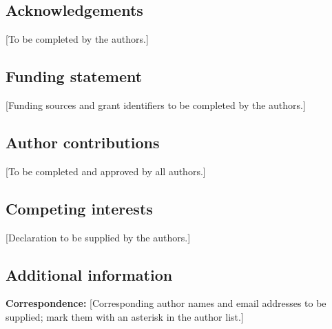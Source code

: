 \documentclass[
  12pt,
  a4paper,
]{article}
\begin{document}
\clearpage

\singlespacing\fontsize{11}{13}\selectfont

\hypertarget{acknowledgements}{%
\subsection{Acknowledgements}\label{acknowledgements}}

{[}To be completed by the authors.{]}

\singlespacing\fontsize{11}{13}\selectfont

\hypertarget{funding-statement}{%
\subsection{Funding statement}\label{funding-statement}}

{[}Funding sources and grant identifiers to be completed by the
authors.{]}

\singlespacing\fontsize{11}{13}\selectfont

\hypertarget{author-contributions}{%
\subsection{Author contributions}\label{author-contributions}}

{[}To be completed and approved by all authors.{]}

\singlespacing\fontsize{11}{13}\selectfont

\hypertarget{competing-interests}{%
\subsection{Competing interests}\label{competing-interests}}

{[}Declaration to be supplied by the authors.{]}

\singlespacing\fontsize{11}{13}\selectfont

\hypertarget{additional-information}{%
\subsection{Additional information}\label{additional-information}}

\textbf{Correspondence:} {[}Corresponding author names and email
addresses to be supplied; mark them with an asterisk in the author
list.{]}

\clearpage

\singlespacing\sffamily\fontsize{7}{9}\selectfont
\end{document}
